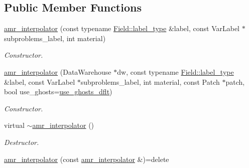 \subsection*{Public Member Functions}
\begin{DoxyCompactItemize}
\item 
\hyperlink{classUintah_1_1PhaseField_1_1detail_1_1amr__interpolator_3_01ScalarField_3_01T_01_4_00_01Problem64f2458f98b03e27672a091eecc4b696_a71dd7bddaaeff40500a9bb9e8c1d2885}{amr\+\_\+interpolator} (const typename \hyperlink{structUintah_1_1PhaseField_1_1ScalarField_a7a77875e030da64c47ce9f6c22a06959}{Field\+::label\+\_\+type} \&label, const Var\+Label $\ast$subproblems\+\_\+label, int material)
\begin{DoxyCompactList}\small\item\em Constructor. \end{DoxyCompactList}\item 
\hyperlink{classUintah_1_1PhaseField_1_1detail_1_1amr__interpolator_3_01ScalarField_3_01T_01_4_00_01Problem64f2458f98b03e27672a091eecc4b696_af4062a318cfc2a19b0e57eb9478e406b}{amr\+\_\+interpolator} (Data\+Warehouse $\ast$dw, const typename \hyperlink{structUintah_1_1PhaseField_1_1ScalarField_a7a77875e030da64c47ce9f6c22a06959}{Field\+::label\+\_\+type} \&label, const Var\+Label $\ast$subproblems\+\_\+label, int material, const Patch $\ast$patch, bool use\+\_\+ghosts=\hyperlink{classUintah_1_1PhaseField_1_1detail_1_1amr__interpolator_3_01ScalarField_3_01T_01_4_00_01Problem64f2458f98b03e27672a091eecc4b696_a659b258bc11df07830b73859f57dee78}{use\+\_\+ghosts\+\_\+dflt})
\begin{DoxyCompactList}\small\item\em Constructor. \end{DoxyCompactList}\item 
virtual \hyperlink{classUintah_1_1PhaseField_1_1detail_1_1amr__interpolator_3_01ScalarField_3_01T_01_4_00_01Problem64f2458f98b03e27672a091eecc4b696_a1ff4737fd9c3eea7dc026410c81e1010}{$\sim$amr\+\_\+interpolator} ()
\begin{DoxyCompactList}\small\item\em Destructor. \end{DoxyCompactList}\item 
\hyperlink{classUintah_1_1PhaseField_1_1detail_1_1amr__interpolator_3_01ScalarField_3_01T_01_4_00_01Problem64f2458f98b03e27672a091eecc4b696_a3eab83979045d441f7296539058bd9d3}{amr\+\_\+interpolator} (const \hyperlink{classUintah_1_1PhaseField_1_1detail_1_1amr__interpolator}{amr\+\_\+interpolator} \&)=delete

\end{DoxyCompactItemize}
